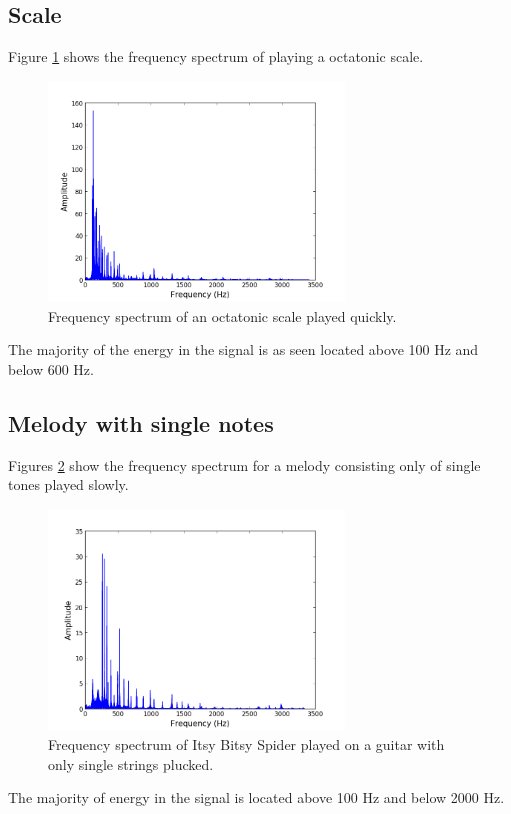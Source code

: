 \subsection{Scale}
Figure \ref{fig:scale_fast} shows the frequency spectrum of playing a octatonic scale.
\begin{figure}[H]
\centering
\includegraphics[width=0.7\textwidth]{figures/freqanal/scale_fast.png}
\caption{Frequency spectrum of an octatonic scale played quickly.}
\label{fig:scale_fast}
\end{figure}
The majority of the energy in the signal is as seen located above 100 Hz and below 600 Hz.

\subsection{Melody with single notes}
Figures \ref{fig:melody_single} show the frequency spectrum for a melody consisting only of single tones played slowly.
\begin{figure}[H]
\centering
\includegraphics[width=0.7\textwidth]{figures/freqanal/melody_single.png}
\caption{Frequency spectrum of Itsy Bitsy Spider played on a guitar with only single strings plucked.}
\label{fig:melody_single}
\end{figure}
The majority of energy in the signal is located above 100 Hz and below 2000 Hz.
